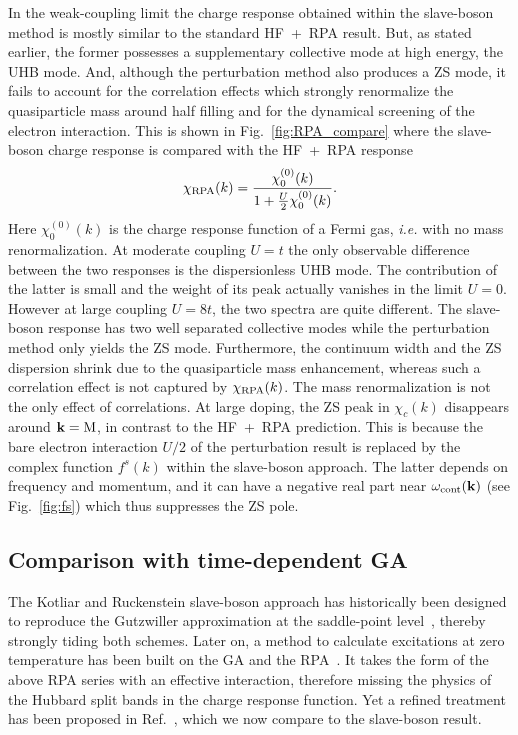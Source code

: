 \documentclass[showpacs,amsmath,twocolumn,floatfix]{revtex4-1}
\begin{document}
In the weak-coupling limit the charge response obtained within the slave-boson 
method is mostly similar to the standard HF~+~RPA result. But, as stated earlier, 
the former possesses a supplementary collective mode at high energy, the UHB mode. 
And, although the perturbation method also produces a ZS mode, it fails to account 
for the correlation effects which strongly renormalize the quasiparticle mass 
around half filling and for the dynamical screening of the electron interaction. 
This is shown in Fig.~\ref{fig:RPA_compare} where the slave-boson charge response 
is compared with the HF~+~RPA response 
\begin{equation}
 \chi_{\rm RPA}(k) = \frac{\chi_0^{(0)}(k)}{1 + \frac{U}{2} \chi_0^{(0)}(k)}.
\end{equation}
Here $\chi_0^{(0)}(k)$ is the charge response function of a Fermi gas, {\it i.e.} with 
no mass renormalization. At moderate coupling $U=t$ the only observable difference
between the two responses is the dispersionless UHB mode. The contribution of the 
latter is small and the weight of its peak actually vanishes in the limit $U=0$.
However at large coupling $U=8t$, the two spectra are quite different. The 
slave-boson response has two well separated collective modes while the perturbation 
method only yields the ZS mode. Furthermore, the continuum width and the ZS 
dispersion shrink due to the quasiparticle mass enhancement, whereas such a
correlation effect is not captured by $\chi_{\rm RPA}(k)$. The mass renormalization
is not the only effect of correlations. At large doping, the ZS peak in $\chi_c(k)$
disappears around ${\bf k}={\rm M}$, in contrast to the HF~+~RPA prediction. This is
because the bare electron interaction $U/2$ of the perturbation result is replaced by 
the complex function $f^s(k)$ within the slave-boson approach. The latter depends on 
frequency and momentum, and it can have a negative real part near 
$\omega_{\rm cont}({\bf k})$ (see Fig.~\ref{fig:fs}) which thus suppresses the ZS pole. 


\subsection{Comparison with time-dependent GA}

The Kotliar and Ruckenstein slave-boson approach has historically been designed 
to reproduce the Gutzwiller approximation at the saddle-point level~\cite{Kot86}, 
thereby strongly tiding both schemes. Later on, a method to calculate excitations 
at zero temperature has been built on the GA and the RPA~\cite{Sei01}. It takes 
the form of the above RPA series with an effective interaction, therefore missing 
the physics of the Hubbard split bands in the charge response function. Yet a 
refined treatment has been proposed in Ref.~\cite{Bun13}, which we now compare to 
the slave-boson result. 
\end{document}
